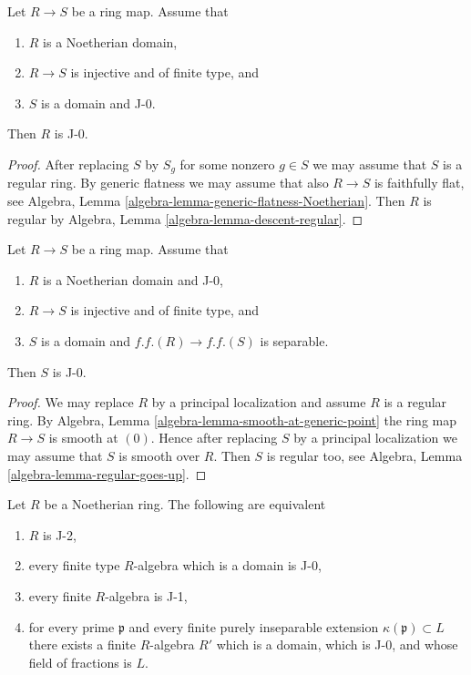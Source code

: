 \begin{lemma}
\label{lemma-J-0-goes-down}
Let $R \to S$ be a ring map. Assume that
\begin{enumerate}
\item $R$ is a Noetherian domain,
\item $R \to S$ is injective and of finite type, and
\item $S$ is a domain and J-0.
\end{enumerate}
Then $R$ is J-0.
\end{lemma}

\begin{proof}
After replacing $S$ by $S_g$ for some nonzero $g \in S$ we may assume
that $S$ is a regular ring. By generic flatness we may assume that also
$R \to S$ is faithfully flat, see
Algebra, Lemma \ref{algebra-lemma-generic-flatness-Noetherian}.
Then $R$ is regular by
Algebra, Lemma \ref{algebra-lemma-descent-regular}.
\end{proof}

\begin{lemma}
\label{lemma-J-0-goes-up}
Let $R \to S$ be a ring map. Assume that
\begin{enumerate}
\item $R$ is a Noetherian domain and J-0,
\item $R \to S$ is injective and of finite type, and
\item $S$ is a domain and $f.f.(R) \to f.f.(S)$ is separable.
\end{enumerate}
Then $S$ is J-0.
\end{lemma}

\begin{proof}
We may replace $R$ by a principal localization and assume $R$ is
a regular ring. By Algebra, Lemma \ref{algebra-lemma-smooth-at-generic-point}
the ring map $R \to S$ is smooth at $(0)$.
Hence after replacing $S$ by a principal localization
we may assume that $S$ is smooth over $R$.
Then $S$ is regular too, see
Algebra, Lemma \ref{algebra-lemma-regular-goes-up}.
\end{proof}

\begin{lemma}
\label{lemma-J-2}
Let $R$ be a Noetherian ring. The following are equivalent
\begin{enumerate}
\item $R$ is J-2,
\item every finite type $R$-algebra which is a domain is J-0,
\item every finite $R$-algebra is J-1,
\item for every prime $\mathfrak p$ and every finite purely inseparable
extension $\kappa(\mathfrak p) \subset L$ there exists a finite
$R$-algebra $R'$ which is a domain, which is J-0, and whose field
of fractions is $L$.
\end{enumerate}
\end{lemma}


